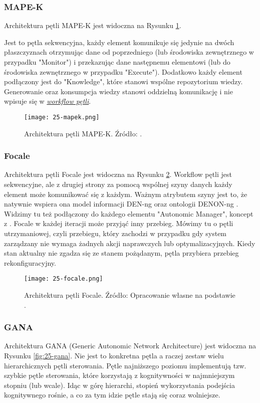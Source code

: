 \subsubsection{MAPE-K}
Architektura pętli MAPE-K \cite{kephart2003} jest widoczna na Rysunku \ref{fig:25-mapek}.

Jest to pętla sekwencyjna, każdy element komunikuje się jedynie na dwóch płaszczyznach otrzymując dane od poprzedniego (lub środowiska zewnętrznego w przypadku "Monitor") i przekazując dane następnemu elementowi (lub do środowiska zewnętrznego w przypadku "Execute"). Dodatkowo każdy element podłączony jest do "Knowledge", które stanowi wspólne repozytorium wiedzy. Generowanie oraz konsumpcja wiedzy stanowi oddzielną komunikację i nie wpisuje się w \hyperlink{def:workflow}{\textit{workflow pętli}}. 

\begin{figure}[!h]
    \centering \texttt{[image: 25-mapek.png]}
    \caption{Architektura pętli MAPE-K. Źródło: \cite{etsieni2024}.}\label{fig:25-mapek}
\end{figure}

\subsubsection{Focale}
Architektura pętli Focale \cite{strassner2007} jest widoczna na Rysunku \ref{fig:25-focale}. Workflow pętli jest sekwencyjne, ale z drugiej strony za pomocą wspólnej szyny danych każdy element może komunikować się z każdym. Ważnym atrybutem szyny jest to, że natywnie wspiera ona model informacji DEN-ng \cite{strassner2003} oraz ontologii DENON-ng \cite{strassner2007}. Widzimy tu też podłączony do każdego elementu "Autonomic Manager", koncept z \cite{kephart2003}. Focale w każdej iteracji może przyjąć inny przebieg. Mówimy tu o pętli utrzymaniowej, czyli przebiegu, który zachodzi w przypadku gdy system zarządzany nie wymaga żadnych akcji naprawczych lub optymalizacyjnych. Kiedy stan aktualny nie zgadza się ze stanem pożądanym, pętla przybiera przebieg rekonfiguracyjny.

\begin{figure}[!h]
    \centering \texttt{[image: 25-focale.png]}
    \caption{Architektura pętli Focale. Źródło: Opracowanie własne na podstawie \cite{etsieni2024}.}\label{fig:25-focale}
\end{figure}

\subsubsection{GANA}
Architektura GANA (Generic Autonomic Network Architecture) \cite{etsigana2018} jest widoczna na Rysunku \ref{fig:25-gana}. Nie jest to konkretna pętla a raczej zestaw wielu hierarchicznych pętli sterowania. Pętle najniższego poziomu implementują tzw. szybkie pętle sterowania, które korzystają z kognitywności w najmniejszym stopniu (lub wcale). Idąc w górę hierarchi, stopień wykorzystania podejścia kognitywnego rośnie, a co za tym idzie pętle stają się coraz wolniejsze. 

